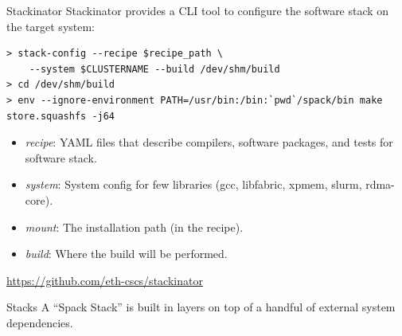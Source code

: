 \documentclass[aspectratio=43]{beamer}
\begin{document}
\begin{frame}[fragile]{Stackinator}
    Stackinator provides a CLI tool to configure the software stack on the target system:

            \begin{lstlisting}[style=talkbash]
> stack-config --recipe $recipe_path \
    --system $CLUSTERNAME --build /dev/shm/build
> cd /dev/shm/build
> env --ignore-environment PATH=/usr/bin:/bin:`pwd`/spack/bin make store.squashfs -j64
            \end{lstlisting}

    \begin{itemize}
        \item \emph{recipe}: YAML files that describe compilers, software packages, and tests for software stack.
        \item \emph{system}: System config for few libraries (gcc, libfabric, xpmem, slurm, rdma-core).
        \item \emph{mount}: The installation path (in the recipe).
        \item \emph{build}: Where the build will be performed.
    \end{itemize}

    \url{https://github.com/eth-cscs/stackinator}
\end{frame}

\begin{frame}[fragile]{Stacks}
    A ``Spack Stack'' is built in layers on top of a handful of external system dependencies.
    \begin{center}
        
    \end{center}
\end{frame}
\end{document}
